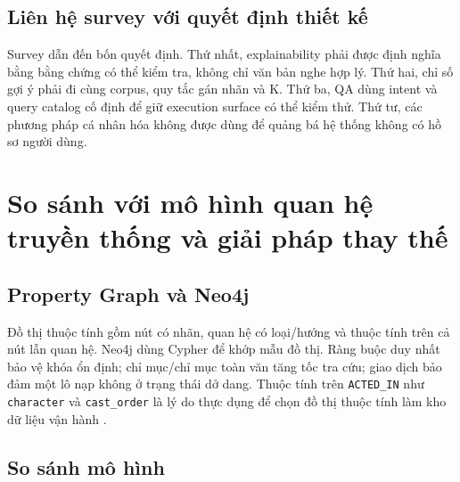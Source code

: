 \subsection{Liên hệ survey với quyết định thiết kế}

Survey dẫn đến bốn quyết định. Thứ nhất, explainability phải được định nghĩa bằng
bằng chứng có thể kiểm tra, không chỉ văn bản nghe hợp lý. Thứ hai, chỉ số gợi ý
phải đi cùng corpus, quy tắc gán nhãn và K. Thứ ba, QA dùng intent và query
catalog cố định để giữ execution surface có thể kiểm thử. Thứ tư, các
phương pháp cá nhân hóa không được dùng để quảng bá hệ thống không có hồ sơ người dùng.

\section{So sánh với mô hình quan hệ truyền thống và giải pháp thay thế}

\subsection{Property Graph và Neo4j}

Đồ thị thuộc tính gồm nút có nhãn, quan hệ có loại/hướng và thuộc tính trên cả
nút lẫn quan hệ. Neo4j dùng Cypher để khớp mẫu đồ thị. Ràng buộc duy nhất bảo vệ
khóa ổn định; chỉ mục/chỉ mục toàn văn tăng tốc tra cứu; giao dịch bảo đảm một lô
nạp không ở trạng thái dở dang. Thuộc tính trên \texttt{ACTED\_IN} như
\texttt{character} và \texttt{cast\_order} là lý do thực dụng để chọn đồ thị
thuộc tính làm kho dữ liệu vận hành \cite{neo4j2026cypher}.

\subsection{So sánh mô hình}

